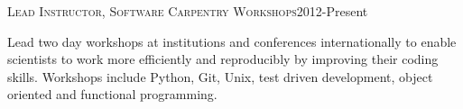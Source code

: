 \documentclass[10pt]{cv}
\begin{document}
\begin{llist}
\begin{minipage}[l]{0.7\textwidth}
\end{minipage}\vspace{0.15cm}
\vspace{-0.1in}   
\textsc{Lead Instructor, Software Carpentry Workshops}\hfill 2012-Present\\
\begin{minipage}[l]{0.7\textwidth}\vspace{0.15cm}
Lead two day workshops at institutions and conferences internationally to enable scientists to work more efficiently and reproducibly by improving their coding skills. Workshops include Python, Git, Unix, test driven development, object oriented and functional programming. \\
\end{minipage}\vspace{0.15cm}

\end{llist}
\end{document}
